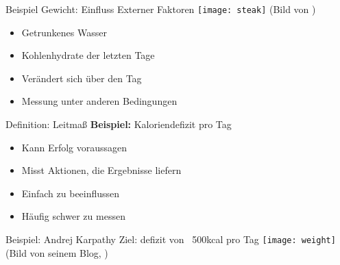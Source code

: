 \begin{frame}[c]{Beispiel Gewicht: Einfluss Externer Faktoren}
    \small
    \texttt{[image: steak]}
    (Bild von \cite{steak-pic})
    \large
    \begin{itemize}[<+(1)->]
        \item Getrunkenes Wasser
        \item Kohlenhydrate der letzten Tage
        \item Verändert sich über den Tag
        \item Messung unter anderen Bedingungen
    \end{itemize}
\end{frame}

\begin{frame}[c]{Definition: Leitmaß}
    \large
    \pause
    \textbf{Beispiel:} Kaloriendefizit pro Tag
    \begin{itemize}[<+(1)->]
        \item Kann Erfolg voraussagen
        \item Misst Aktionen, die Ergebnisse liefern
        \item Einfach zu beeinflussen
        \item Häufig schwer zu messen
    \end{itemize}
\end{frame}


\begin{frame}[c]{Beispiel: Andrej Karpathy}
    \large
    Ziel: defizit von ~500kcal pro Tag
    \texttt{[image: weight]} \\
    (Bild von seinem Blog, \cite{weight-pic})
\end{frame}




